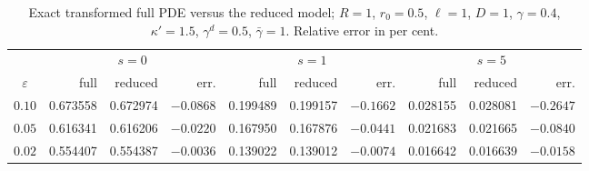 \documentclass[pdflatex,sn-mathphys-num]{sn-jnl}
\numberwithin{equation}{section}
\theoremstyle{thmstyleone}%
\theoremstyle{definition}
\theoremstyle{remark}
\begin{document}
\begin{appendices}
\begin{table}[htbp]\centering\small
\caption{Exact transformed full PDE versus the reduced model; $R=1$, $r_0=0.5$,
$\ell=1$, $D=1$, $\gamma=0.4$, $\kappa'=1.5$, $\gamma^d=0.5$, $\bar\gamma=1$.
Relative error in per cent.}
\label{tab:verify}
\begin{tabular}{@{}c|rrr|rrr|rrr@{}}
\toprule
&\multicolumn{3}{c|}{$s=0$}&\multicolumn{3}{c|}{$s=1$}&\multicolumn{3}{c}{$s=5$}\\
$\varepsilon$&full&reduced&err.&full&reduced&err.&full&reduced&err.\\
\midrule
$0.10$&0.673558&0.672974&$-0.0868$&0.199489&0.199157&$-0.1662$&0.028155&0.028081&$-0.2647$\\
$0.05$&0.616341&0.616206&$-0.0220$&0.167950&0.167876&$-0.0441$&0.021683&0.021665&$-0.0840$\\
$0.02$&0.554407&0.554387&$-0.0036$&0.139022&0.139012&$-0.0074$&0.016642&0.016639&$-0.0158$\\
\bottomrule
\end{tabular}
\end{table}

\end{appendices}


\end{document}
